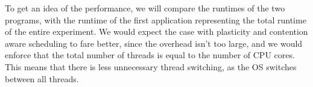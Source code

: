 To get an idea of the performance, we will compare the runtimes of the two programs, with the runtime of the first application representing the total runtime of the entire experiment. We would expect the case with plasticity and contention aware scheduling to fare better, since the overhead isn't too large, and we would enforce that the total number of threads is equal to the number of CPU cores. This means that there is less unnecessary thread switching, as the OS switches between all threads.

